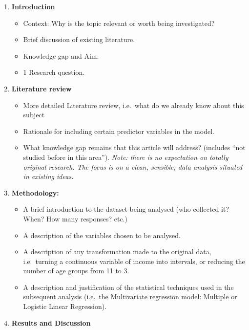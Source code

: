 \documentclass[
  letterpaper,
  DIV=11,
  numbers=noendperiod]{scrreprt}
\providecommand{\tightlist}{%
  \setlength{\itemsep}{0pt}\setlength{\parskip}{0pt}}\usepackage{longtable,booktabs,array}
\begin{document}
\begin{enumerate}
\def\labelenumi{\arabic{enumi}.}
\tightlist
\item
  \textbf{Introduction}

  \begin{itemize}
  \tightlist
  \item
    Context: Why is the topic relevant or worth being investigated?
  \item
    Brief discussion of existing literature.
  \item
    Knowledge gap and Aim.
  \item
    1 Research question.
  \end{itemize}
\item
  \textbf{Literature review}

  \begin{itemize}
  \tightlist
  \item
    More detailed Literature review, i.e.~what do we already know about
    this subject
  \item
    Rationale for including certain predictor variables in the model.
  \item
    What knowledge gap remains that this article will address? (includes
    ``not studied before in this area''). \emph{Note: there is no
    expectation on totally original research. The focus is on a clean,
    sensible, data analysis situated in existing ideas.}
  \end{itemize}
\item
  \textbf{Methodology:}

  \begin{itemize}
  \tightlist
  \item
    A brief introduction to the dataset being analysed (who collected
    it? When? How many responses? etc.)
  \item
    A description of the variables chosen to be analysed.
  \item
    A description of any transformation made to the original data,
    i.e.~turning a continuous variable of income into intervals, or
    reducing the number of age groups from 11 to 3.
  \item
    A description and justification of the statistical techniques used
    in the subsequent analysis (i.e.~the Multivariate regression model:
    Multiple or Logistic Linear Regression).
  \end{itemize}
\item
  \textbf{Results and Discussion}


\end{enumerate}
\end{document}
